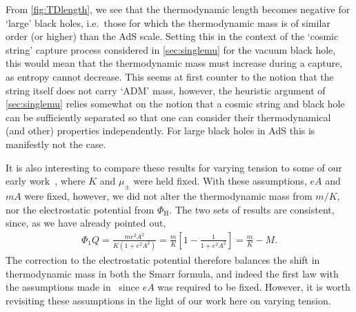 \documentclass[
twoside,
openright,
frontopenright
]{dmathesis}
\begin{document}
From \cref{fig:TDlength}, we see that the thermodynamic length becomes negative
for `large' black holes, i.e.\ those for which the thermodynamic mass is of
similar order (or higher) than the AdS scale. Setting this in the context of the
`cosmic string' capture process considered in \cref{sec:singlemu} for the vacuum
black hole, this would mean that the thermodynamic mass must increase during a
capture, as entropy cannot decrease. This seems at first counter to the notion
that the string itself does not carry `ADM' mass, however, the heuristic
argument of \cref{sec:singlemu} relies somewhat on the notion that a cosmic
string and black hole can be sufficiently separated so that one can consider
their thermodynamical (and other) properties independently. For large black
holes in AdS this is manifestly not the case.

It is also interesting to compare these results for varying tension to some of
our early work~\cite{Appels:2016uha}, where $K$ and $\mu_\pm$ were held fixed.
With these assumptions, $eA$ and $mA$ were fixed, however, we did not alter the
thermodynamic mass from $m/K$, nor the electrostatic potential from
$\Phi_\mathrm{H}$. The two sets of results are consistent, since, as we have
already pointed out,
\begin{align*}
\Phi_1 Q = \frac{m e^2 A^2}{K(1+e^2 A^2)} 
= \frac{m}{K} \left [ 1 - \frac{1}{1+e^2 A^2} \right] = \frac{m}{K} - M.
\end{align*}
The correction to the electrostatic potential therefore balances the shift in
thermodynamic mass in both the Smarr formula, and indeed the first law with the
assumptions made in~\cite{Appels:2016uha} since $eA$ was required to be
fixed. However, it is worth revisiting these assumptions in the light of our
work here on varying tension.
\end{document}
